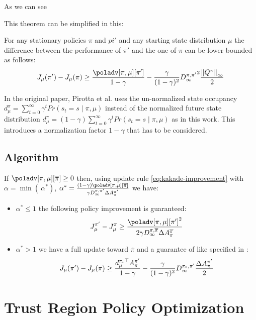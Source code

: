 As we can see 

This theorem can be simplified in this:

\begin{theorem}
For any stationary policies $\pi$ and $pi'$ and any starting state distribution $\mu$ the difference between the performance of $\pi'$ and the one of $\pi$ can be lower bounded as follows:
\begin{equation}
J_{\mu}(\pi') - J_\mu(\pi) \geq \frac{\poladv[\pi, \mu][\pi']}{1-\gamma} - \frac{\gamma}{(1-\gamma)^2}{D_\infty^{\pi, \pi'}}^2 \frac{\norm[\infty]{Q^\pi}}{2}
\end{equation}
\end{theorem}

\begin{note}
In the original paper, Pirotta et al. uses the un-normalized state occupancy $d_{\mu}^{\pi} = \sum_{t=0}^{\infty}\gamma^t Pr(s_t = s \mid \pi, \mu)$ instead of the normalized future state distribution $d_{\mu}^{\pi} = (1-\gamma)\sum_{t=0}^{\infty}\gamma^t Pr(s_t = s \mid \pi, \mu)$ as in this work. This introduces a normalization factor $1-\gamma$ that has to be considered.
\end{note}

\subsection{Algorithm}
\begin{theorem}
If $\poladv[\pi, \mu][\overline{\pi}] \geq 0$ then, using update rule \ref{eq:kakade-improvement} with $\alpha = \min(\, \alpha^*)$, $\alpha^* = \frac{(1-\gamma)\poladv[\pi, \mu][\overline{\pi}]}{\gamma D_\infty^{\pi, \pi'}\Delta A_\pi^{\pi'}}$ we have:
\begin{itemize}
\item $\alpha^* \leq 1$ the following policy improvement is guaranteed:
\[
J_\mu^{\pi'} - J_\mu^\pi \geq \frac{{\poladv[\pi, \mu][\pi']}^2}{2\gamma D_\infty^{\pi, \overline{\pi}}\Delta A_\pi^{\overline{\pi}}}
\]
\item $\alpha^* > 1$ we have a full update toward $\overline{\pi}$ and a guarantee of like specified in :
\begin{equation}
J_{\mu}(\pi') - J_\mu(\pi) \geq \frac{{d_\mu^{\pi_b}}^{\mathsf{T}}A_\pi^{\pi'}}{1-\gamma} - \frac{\gamma}{(1-\gamma)^2}{D_\infty^{\pi_b, \pi'}} \frac{\Delta A_{\pi}^{\pi'}}{2}
\end{equation}
\end{itemize}
\end{theorem}


\section{Trust Region Policy Optimization}
\label{sec:trpo}